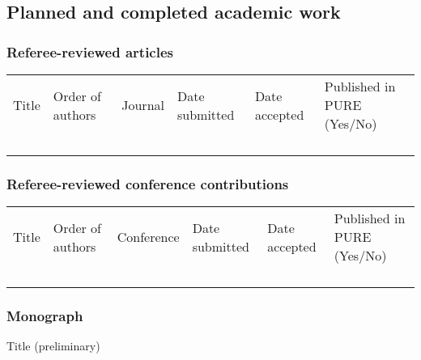 \subsection{Planned and completed academic work}
\subsubsection*{Referee-reviewed articles}
{\scriptsize
\begin{tabular}{p{3.5cm}p{3cm}p{2.5cm}p{1.5cm}p{1.5cm}p{1.5cm}}
Title &
\raggedright Order of authors &
Journal &
\raggedright Date submitted &
\raggedright Date accepted &
Published in PURE (Yes/No)\\
\rowcolor[gray]{0.90}          &                   &                    &            &            &    \\
\rowcolor[gray]{0.95}          &                   &                    &            &            &    \\
\rowcolor[gray]{0.90}          &                   &                    &            &            &    \\
\rowcolor[gray]{0.95}          &                   &                    &            &            &    \\
\end{tabular}}

\subsubsection*{Referee-reviewed conference contributions}
{\scriptsize
\begin{tabular}{p{3.5cm}p{3cm}p{2.5cm}p{1.5cm}p{1.5cm}p{1.5cm}}
Title &
\raggedright Order of authors &
Conference &
\raggedright Date submitted &
\raggedright Date accepted &
Published in PURE (Yes/No)\\
\rowcolor[gray]{0.90}          &                   &                    &            &            &    \\
\rowcolor[gray]{0.95}          &                   &                    &            &            &    \\
\rowcolor[gray]{0.90}          &                   &                    &            &            &    \\
\rowcolor[gray]{0.95}          &                   &                    &            &            &    \\
\end{tabular}}

\subsubsection*{Monograph}
Title (preliminary)

